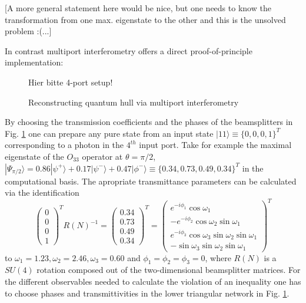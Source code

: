 \documentclass[prl,showpacs,showkeys,amsfonts,amsmath,twocolumn]{revtex4}
\newcommand{\ket}[1]{|#1\rangle}
\begin{document}
[A more general statement here would be nice, but one needs to know the
transformation from one max. eigenstate to the other and this is the
unsolved problem :(...]

In contrast multiport interferometry \cite{rzbb,zukowski-97,svozil-2004-analog}
offers a direct proof-of-principle
implementation:
\begin{figure}[htbp]
  \centering
  Hier bitte 4-port setup!\vspace*{50mm}
  \caption{Reconstructing quantum hull via multiport interferometry}
  \label{2004-qbounds-f3}
\end{figure}
By choosing the transmission coefficients and the phases of the
beamsplitters in Fig. \ref{2004-qbounds-f3} one can prepare any pure state
from an input state $\ket{11} \equiv \{0,0,0,1\}^T$ corresponding to a photon
in the $4^{th}$ input port. Take for example the maximal eigenstate of
the $O_{33}$ operator at $\theta=\pi/2$, $\ket{\Psi_{\pi/2}}= 0.86
  \ket{\psi^+} + 0.17\ket{\psi^-} + 0.47\ket{\phi^-} \equiv
  \{0.34,0.73,0.49,0.34\}^T$ in the computational basis. The apropriate transmittance parameters
  can be calculated via the identification \cite{rzbb}
  \begin{equation}
    \begin{pmatrix}0\\0\\0\\1\end{pmatrix}^T R(N)^{-1} =  \begin{pmatrix}0.34\\0.73\\0.49\\0.34\end{pmatrix}^T =
    \begin{pmatrix}e^{-i\phi_1}\cos\omega_1 \\-e^{-i\phi_2}\cos\omega_2\sin\omega_1\\e^{-i\phi_3}\cos\omega_3\sin\omega_2\sin\omega_1\\-\sin\omega_3\sin\omega_2\sin\omega_1\end{pmatrix}^T
  \end{equation}
to $\omega_1 = 1.23, \omega_2=2.46,\omega_3=0.60$ and $\phi_1=\phi_2=\phi_3=0$, where $R(N)$ is a
$SU(4)$ rotation composed out of the two-dimensional beamsplitter
matrices. For the different observables needed to calculate the
violation of an inequality one has to choose phases and
transmittivities in the lower triangular network in Fig. \ref{2004-qbounds-f3}.
\end{document}
